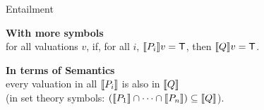 \documentclass[xetex,aspectratio=169,14pt,hyperref={pdfpagelabels=true,pdflang={en-GB}}]{beamer}
\begin{document}
\begin{frame}
  {Entailment}

  \textbf{With more symbols} \\\qquad for all valuations $v$, if, for
  all $i$, $\llbracket P_i \rrbracket v = \mathsf{T}$, then $\llbracket Q \rrbracket v = \mathsf{T}$.

  \bigskip

  \textbf{In terms of Semantics}\\ \qquad every valuation in all $\llbracket P_i \rrbracket$
  is also in $\llbracket Q \rrbracket$ \\ \qquad (in set theory symbols:
  $(\llbracket P_1 \rrbracket \cap \dots \cap \llbracket P_n \rrbracket) \subseteq \llbracket Q \rrbracket$).
\end{frame}





\end{document}
